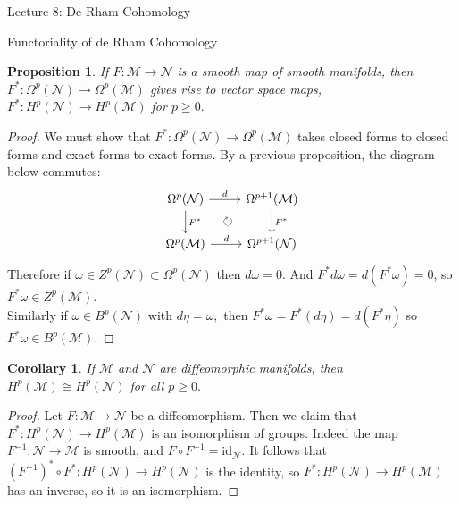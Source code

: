 \documentclass[10pt]{article}
\theoremstyle{plain}
\newtheorem{corollary}[thm]{Corollary}
\newtheorem{prop}[thm]{Proposition}
\theoremstyle{definition}
\newcommand{\id}{\text{id}}
\newcommand{\man}{\mathcal{M}}
\newcommand{\nan}{\mathcal{N}}
\newcommand{\pformman}[1]{\Omega^{#1}(\man)}
\newcommand{\pformnan}[1]{\Omega^{#1}(\nan)}
\newcommand{\deriv}{d}
\newcommand{\dw}{d\omega}
\newcommand{\cohomman}[1]{H^{#1}(\man)}
\newcommand{\coZman}[1]{Z^{#1}(\man)}
\newcommand{\cohomnan}[1]{H^{#1}(\nan)}
\begin{document}
\begin{section}{Lecture 8: De Rham Cohomology}
\begin{subsection}{Functoriality of de Rham Cohomology}
\begin{prop}
If $F: \man \to \nan $ is a smooth map of smooth manifolds, then $F^*: \pformnan{p} \to \pformman{p}$ gives rise to vector space maps, $F^*: \cohomnan{p} \to \cohomman{p}$ for $p\geq 0.$
\end{prop}

\begin{proof}
We must show that $F^*:\pformnan{p} \to \pformman{p}$ takes closed forms to closed forms and exact forms to exact forms. By a previous proposition, the diagram below commutes:%
$$\begin{tikzcd}
\centering{}
{\pformnan{p}}\arrow[r,"d"]\arrow[dr,phantom,"\circlearrowright"] \arrow[d,"F^*"] & {\pformman{p+1}} \arrow[d,"F^*"] \\
{\pformman{p}} \arrow[r,"d"]           & {\pformnan{p+1}}  
\end{tikzcd}$$
Therefore if $\omega \in Z^p(\nan) \subset \pformnan{p}$ then $\dw = 0.$ And $F^*\dw = d(F^*\omega) = 0$, so $F^*\omega \in \coZman{p}.$ 
\\Similarly if $\omega \in B^p(\nan)$ with $\deriv \eta = \omega,$ then $F^*\omega = F^*(\deriv \eta) = \deriv(F^*\eta)$ so $F^*\omega \in B^p(\man).$
\end{proof}
\begin{corollary}
If $\man$ and $\nan$ are diffeomorphic manifolds, then $\cohomman{p} \cong \cohomnan{p}$ for all $p \geq 0.$
\end{corollary}
\begin{proof}
Let $F:\man \to \nan$ be a diffeomorphism. Then we claim that $F^*: \cohomnan{p} \to \cohomman{p}$ is an isomorphism of groups. Indeed the map $F^{-1} : \nan \to \man$ is smooth, and $F\circ F^{-1} = \id_\nan$. It follows that $(F^{-1})^*\circ F^* : \cohomnan{p} \to \cohomnan{p}$ is the identity, so $F^*: \cohomnan{p} \to \cohomman{p} $ has an inverse, so it is an isomorphism.
\end{proof}
\end{subsection}
\end{section}
\end{document}
